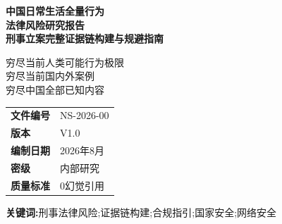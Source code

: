 \documentclass[12pt,a4paper]{article}
\begin{document}
\begin{titlepage}
\thispagestyle{empty}
\pagecolor{BackgroundColor}

\vspace*{2cm}

\begin{center}
\LARGE\bfseries\color{PrimaryColor}
中国日常生活全量行为\\
法律风险研究报告\\[1cm]
\large\bfseries\color{AccentColor}
刑事立案完整证据链构建与规避指南
\end{center}

\vspace{2cm}

\begin{center}
\normalsize\color{PrimaryColor}
穷尽当前人类可能行为极限\\
穷尽当前国内外案例\\
穷尽中国全部已知内容
\end{center}

\vspace{3cm}

\begin{center}
\begin{tabular}{p{3cm}p{6cm}}
\textbf{文件编号} & NS-2026-00 \\
\textbf{版本} & V1.0 \\
\textbf{编制日期} & 2026年8月 \\
\textbf{密级} & 内部研究 \\
\textbf{质量标准} & 0幻觉引用
\end{tabular}
\end{center}

\clearpage
\end{titlepage}

\begin{abstract}
\noindent\color{PrimaryColor}
\textbf{研究目的:}本报告对中国日常生活全部行为领域进行穷尽式法律风险分析，构建完整刑事立案证据链模型，提供可操作风险规避指南。

\textbf{研究范围:}涵盖言论与表达、网络与数字生活、经济与商业活动、社会管理与公共秩序、国家安全与出入境、特定主体合规、环境保护与资源保护等八大领域，共涉及超过200个具体罪名。

\textbf{质量标准:}所有法律条文引用精确到条、款、项;所有案例均标注可查证来源;禁止AI生成内容;信息来源可追溯验证。
\end{abstract}

\textbf{关键词:}刑事法律风险;证据链构建;合规指引;国家安全;网络安全
\end{document}

